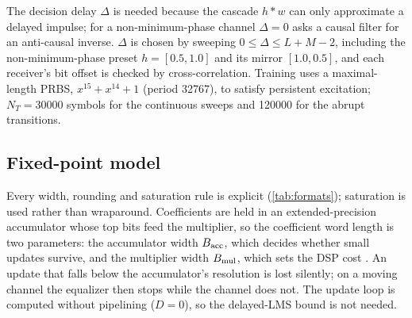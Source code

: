 The decision delay $\Delta$ is needed because the cascade $h*w$ can only approximate a delayed impulse; for a non-minimum-phase channel $\Delta=0$ asks a causal filter for an anti-causal inverse. $\Delta$ is chosen by sweeping $0\le\Delta\le L+M-2$, including the non-minimum-phase preset $h=[0.5,1.0]$ and its mirror $[1.0,0.5]$, and each receiver's bit offset is checked by cross-correlation. Training uses a maximal-length PRBS, $x^{15}+x^{14}+1$ (period 32767), to satisfy persistent excitation; $N_T=30000$ symbols for the continuous sweeps and 120000 for the abrupt transitions. 

\subsection{Fixed-point model}
\label{sec:fixed}
Every width, rounding and saturation rule is explicit (\cref{tab:formats}); saturation is used rather than wraparound. Coefficients are held in an extended-precision accumulator whose top bits feed the multiplier, so the coefficient word length is two parameters: the accumulator width $B_{\rm acc}$, which decides whether small updates survive, and the multiplier width $B_{\rm mul}$, which sets the DSP cost \cite{constantinides2003,gitlin1982}. An update that falls below the accumulator's resolution is lost silently; on a moving channel the equalizer then stops while the channel does not.  The update loop is computed without pipelining ($D=0$), so the delayed-LMS bound \cite{long1989} is not needed. 

